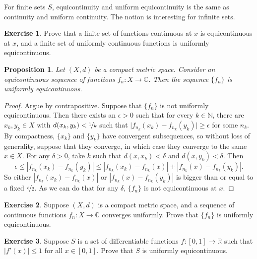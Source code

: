 \documentclass[12pt,openany]{book}
\newcommand{\sabs}[1]{\lvert {#1} \rvert}
\newcommand{\abs}[1]{\left\lvert {#1} \right\rvert}
\newcommand{\C}{{\mathbb{C}}}
\newcommand{\R}{{\mathbb{R}}}
\newcommand{\N}{{\mathbb{N}}}
\theoremstyle{plain}
\newtheorem{prop}[thm]{Proposition}
\theoremstyle{remark}
\theoremstyle{definition}
\newenvironment{exbox}{%
    \def\FrameCommand{\vrule width 1pt \relax\hspace{10pt}}%
    \MakeFramed{\advance\hsize-\width\FrameRestore}%
}{%
    \endMakeFramed
}
\theoremstyle{exercise}
\newtheorem{exercise}{Exercise}[section]
\theoremstyle{example}
\begin{document}
For finite sets $S$, equicontinuity and uniform equicontinuity
is the same as continuity and uniform continuity.
The notion is interesting for infinite sets.

\begin{exbox}
\begin{exercise}
Prove that a finite set of functions continuous at $x$ is
equicontinuous at $x$, and
a finite set of uniformly continuous functions is uniformly equicontinuous.
\end{exercise}
\end{exbox}

\begin{prop}
Let $(X,d)$ be a compact metric space.
Consider an
equicontinuous sequence of functions
$f_n \colon X \to \C$.
Then the sequence $\{ f_n \}$ is uniformly equicontinuous.
\end{prop}

\begin{proof}
Argue by contrapositive.  Suppose that $\{ f_n \}$ is not
uniformly equicontinuous.  Then there exists an $\epsilon > 0$
such that for every $k \in \N$, there
are $x_k,y_k \in X$ with $d(x_k,y_k) < \nicefrac{1}{k}$
such that $\sabs{f_{n_k}(x_k)-f_{n_k}(y_k)} \geq \epsilon$ for some $n_k$.
By compactness, $\{x_k\}$ and $\{ y_k\}$ have convergent subsequences, so
without loss of generality, suppose that they converge, in which case
they converge to the same $x \in X$.
For any $\delta > 0$, take $k$ such that
$d(x,x_k) < \delta$ and
$d(x,y_k) < \delta$.
Then
\begin{equation*}
\epsilon \leq 
\abs{f_{n_k}(x_k)-f_{n_k}(y_k)}
\leq
\abs{f_{n_k}(x_k)-f_{n_k}(x)} + \abs{f_{n_k}(x)-f_{n_k}(y_k)} .
\end{equation*}
So either 
$\abs{f_{n_k}(x_k)-f_{n_k}(x)}$ or $\abs{f_{n_k}(x)-f_{n_k}(y_k)}$ is
bigger than or equal to a fixed $\nicefrac{\epsilon}{2}$.
As we can do that for any $\delta$,
$\{ f_n \}$ is not equicontinuous at $x$.
\end{proof}

\begin{exbox}
\begin{exercise}
Suppose $(X,d)$ is a compact metric space,
and a sequence of continuous functions $f_n \colon X \to \C$
converges uniformly. Prove that $\{ f_n \}$ is uniformly equicontinuous.
\end{exercise}

\begin{exercise}
Suppose $S$ is a set of differentiable functions $f \colon [0,1] \to \R$
such that $\sabs{f'(x)} \leq 1$ for all $x \in [0,1]$.
Prove that $S$ is uniformly equicontinuous.
\end{exercise}
\end{exbox}
\end{document}

